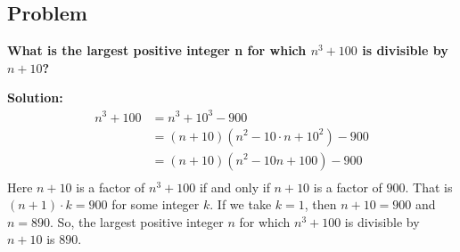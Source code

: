 \subsection{Problem }
\textbf{What is the largest positive integer n for which $n^3 + 100$ is divisible by $n + 10$?}
\par

\begin{flushleft}
\textbf{Solution: }
$$
\begin{aligned}
n^3 + 100 &= n^3 + 10^3 - 900 \\
&= (n + 10)(n^2 - 10 \cdot n + 10^2) - 900 \\
&= (n + 10)(n^2 - 10n + 100) - 900 \\
\end{aligned}
$$
Here $n + 10$ is a factor of $n^3 + 100$ if and only if $n + 10$ is a factor of $900$. 
That is $ (n+1) \cdot k = 900$ for some integer $k$.
If we take $ k = 1$, then $n + 10 = 900$ and $n = 890$.
So, the largest positive integer $n$ for which $n^3 + 100$ is divisible by $n + 10$ is $890$.
\par
\end{flushleft}